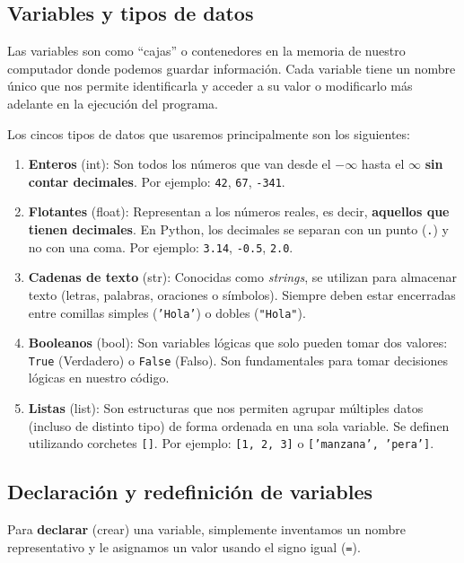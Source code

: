 \documentclass[11pt, a4paper]{article}
\begin{document}
	\subsection{Variables y tipos de datos}
	Las variables son como ``cajas'' o contenedores en la memoria de nuestro computador donde podemos guardar información. Cada variable tiene un nombre único que nos permite identificarla y acceder a su valor o modificarlo más adelante en la ejecución del programa.
	
	Los cincos tipos de datos que usaremos principalmente son los siguientes:
	\begin{enumerate}
		\item \textbf{Enteros} (int): Son todos los números que van desde el $-\infty$ hasta el $\infty$ \textbf{sin contar decimales}. Por ejemplo: \texttt{42}, \texttt{67}, \texttt{-341}.
		
		\item \textbf{Flotantes} (float): Representan a los números reales, es decir, \textbf{aquellos que tienen decimales}. En Python, los decimales se separan con un punto (\texttt{.}) y no con una coma. Por ejemplo: \texttt{3.14}, \texttt{-0.5}, \texttt{2.0}.
		
		\item \textbf{Cadenas de texto} (str): Conocidas como \textit{strings}, se utilizan para almacenar texto (letras, palabras, oraciones o símbolos). Siempre deben estar encerradas entre comillas simples (\texttt{'Hola'}) o dobles (\texttt{"Hola"}).
		
		\item \textbf{Booleanos} (bool): Son variables lógicas que solo pueden tomar dos valores: \texttt{True} (Verdadero) o \texttt{False} (Falso). Son fundamentales para tomar decisiones lógicas en nuestro código.
		
		\item \textbf{Listas} (list): Son estructuras que nos permiten agrupar múltiples datos (incluso de distinto tipo) de forma ordenada en una sola variable. Se definen utilizando corchetes \texttt{[]}. Por ejemplo: \texttt{[1, 2, 3]} o \texttt{['manzana', 'pera']}.
	\end{enumerate}
	
	\subsection{Declaración y redefinición de variables}
	Para \textbf{declarar} (crear) una variable, simplemente inventamos un nombre representativo y le asignamos un valor usando el signo igual (\texttt{=}). \\ 
	
\end{document}
